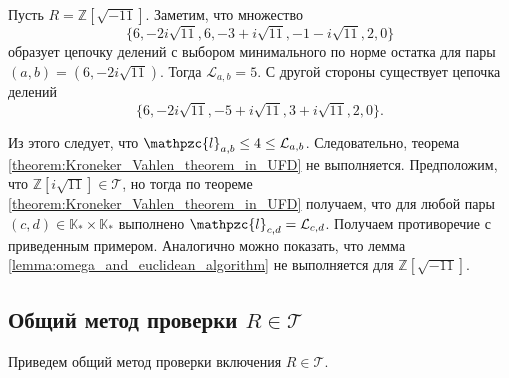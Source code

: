 \documentclass[_00_autoref.tex]{subfiles}
\begin{document}
\begin{example}\label{example:Z[sqrt{-11}]}
    Пусть $R = \mathbb{Z}[\sqrt{-11}]$.
    Заметим, что множество
    \begin{equation*}
        \{6,-2i\sqrt{11},6,-3+i\sqrt{11},-1-i\sqrt{11},2,0\}
    \end{equation*}
    образует цепочку делений с выбором минимального по норме остатка для пары $(a,b)=(6,-2i\sqrt{11})$.
    Тогда $\mathcal{L}_{a,b}=5$.
    С другой стороны существует цепочка делений
    \begin{equation*}
        \{6,-2i\sqrt{11},-5+i\sqrt{11},3+i\sqrt{11},2,0\}.
    \end{equation*}
    
    Из этого следует, что $\mathpzc{l}_{a,b}\le 4\le \mathcal{L}_{a,b}$.
    Следовательно, теорема \ref{theorem:Kroneker_Vahlen_theorem_in_UFD} не выполняется.
    Предположим, что $\mathbb{Z}[i\sqrt{11}]\in\mathcal{T}$, но тогда по теореме \ref{theorem:Kroneker_Vahlen_theorem_in_UFD} получаем, что для любой пары $(c,d)\in\mathbb{K}_* \times\mathbb{K}_*$ выполнено $\mathpzc{l}_{c,d}=\mathcal{L}_{c,d}$.
    Получаем противоречие с приведенным примером.
    Аналогично можно показать, что лемма \ref{lemma:omega_and_euclidean_algorithm} не выполняется для $\mathbb{Z}[\sqrt{-11}].$
\end{example}

\subsection{Общий метод проверки $R \in \mathcal{T}$}

Приведем общий метод проверки включения $R \in \mathcal{T}$.
\end{document}
